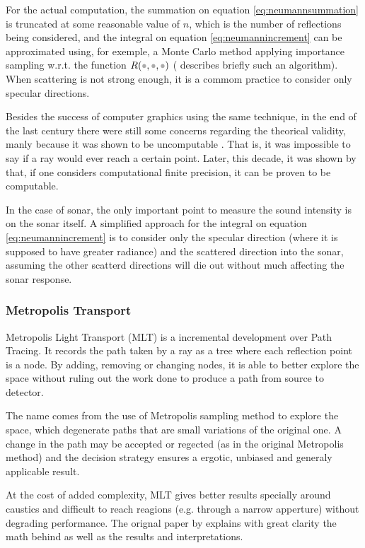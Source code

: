 For the actual computation, the summation on equation \ref{eq:neumannsummation}
is truncated at some reasonable value of $n$, which is the number of
reflections being considered, and the integral on equation
\ref{eq:neumannincrement} can be approximated using, for exemple, a Monte Carlo
method applying importance sampling w.r.t. the function $R(\parm,\parm,\parm)$
(\citet{munjal2013formulas} describes briefly such an algorithm).
When scattering is not strong enough, it is a commom practice to consider only
specular directions. 

Besides the success of computer graphics using the same technique, in the end of
the last century there were still some concerns regarding the theorical
validity, manly because it was shown to be
uncomputable \cite{reif1994computability}. That is, it was impossible to say if
a ray would ever reach a certain point. Later, this decade, it was shown by
\citet{blakey2014ray} that, if one considers computational finite precision, it
can be proven to be computable.

In the case of sonar, the only important point to measure the sound intensity is
on the sonar itself. A simplified approach for the integral on equation
\ref{eq:neumannincrement} is to consider only the specular direction (where it
is supposed to have greater radiance) and the scattered direction into the
sonar, assuming the other scatterd directions will die out without much
affecting the sonar response.


\subsubsection{Metropolis Transport}

Metropolis Light Transport (MLT) is a incremental development over Path Tracing.
It records the path taken by a ray as a tree where each reflection point is a node. By
adding, removing or changing nodes, it is able to better explore the space
without ruling out the work done to produce a path from source to detector.

The name comes from the use of Metropolis sampling method to explore the space,
which degenerate paths that are small variations of the original one. A change
in the path may be accepted or regected (as in the original Metropolis method)
and the decision strategy ensures a ergotic, unbiased and generaly applicable
result.

At the cost of added complexity, MLT gives better results specially around
caustics and difficult to reach reagions (e.g. through a narrow apperture)
without degrading performance. The orignal paper by \citet{veach1997metropolis}
explains with great clarity the math behind as well as the results and
interpretations.


